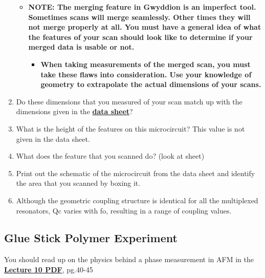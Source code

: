 \documentclass{../lab}
\begin{document}
\begin{enumerate}
    \begin{itemize}
        \item ​​\textbf{NOTE: The merging feature in Gwyddion is an imperfect tool.  Sometimes scans will merge seamlessly. Other times they will not merge properly at all. You must have a general idea of what the features of your scan should look like to determine if your merged data is usable or not.}

        \begin{itemize}
            \item \textbf{​When taking measurements of the merged scan, you must take these flaws into consideration.  Use your knowledge of geometry to extrapolate the actual dimensions of your scans.}

        \end{itemize}

    \end{itemize}

    \item Do these dimensions that you measured of your scan match up with the dimensions given in the \href{http://experimentationlab.berkeley.edu/sites/default/files/AFMImages/CSQ\_Resonators\_1July2011\%20.pdf}{\textbf{data sheet}}?

    \item What is the height of the features on this microcircuit?  This value is not given in the data sheet.

    \item What does the feature that you scanned do? (look at sheet)

    \item Print out the schematic of the microcircuit from the data sheet and identify the area that you scanned by boxing it.

    \item Although the geometric coupling structure is identical for all the multiplexed resonators, Qc varies with fo, resulting in a range of coupling values.

\end{enumerate}

\subsection{Glue Stick Polymer Experiment}

You should read up on the physics behind a phase measurement in AFM in the \href{http://experimentationlab.berkeley.edu/sites/default/files/AFMImages/Lecture\_10\_AFM.pdf}{\textbf{Lecture 10 PDF}}, pg.40-45
\end{document}

